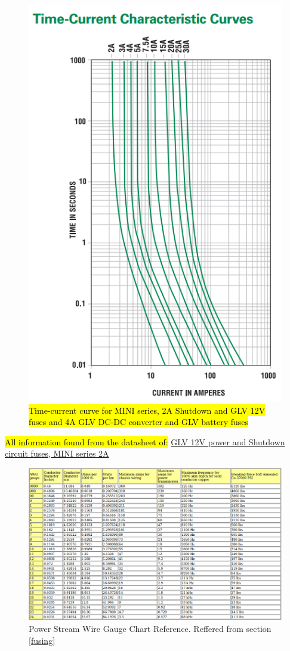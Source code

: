 \documentclass{article}
\DeclareRobustCommand{\hlr}[1]{{\sethlcolor{red}\hl{#1}}}
\begin{document}
\begin{figure}[H]
    \centering
    \includegraphics[width = 0.6 \textwidth]{shutdownfusecurve}
    \caption{\hlr{Time-current curve for MINI series, 2A Shutdown and GLV 12V fuses and 4A GLV DC-DC converter and GLV battery fuses}}
    \label{shutdownfusecurve}
\end{figure}

\hlr{All information found from the datasheet of: }
\href{http://www.littelfuse.com/~/media/automotive/datasheets/fuses/automotive-fuses/littelfuse_automotive_blade_fuse_mini_32v.pdf}{GLV 12V power and Shutdown circuit fuses, MINI series 2A}
\begin{figure}
    \centering
    \includegraphics[width = 1 \textwidth]{WireGaugeChart}
    \caption{Power Stream Wire Gauge Chart Reference. Reffered from section \ref{fusing}}
    \label{AWGchart}
\end{figure}
\end{document}
